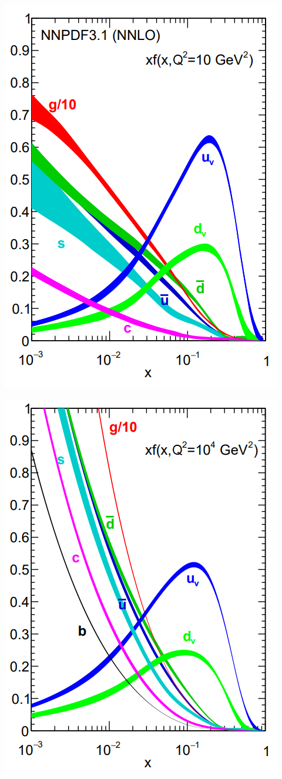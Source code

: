 \documentclass[a4paper, 12pt]{article}
\begin{document}
\begin{centering}
	\vspace{0.2cm}
	\begin{minipage}[t]{0.48\linewidth}
		\centering
		\includegraphics[width=0.7\linewidth]{NNPDF10.PNG}
	\end{minipage}
	\hfill
	\begin{minipage}[t]{0.48\linewidth}
		\centering
		\includegraphics[width=0.7\linewidth]{NNPDF10000.PNG}

\end{minipage}
\end{centering}
\end{document}
